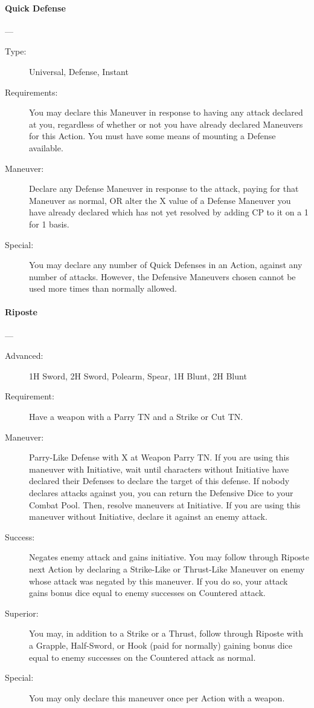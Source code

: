 \documentclass[oneside,11pt,english]{book}
\begin{document}
\paragraph{\large\label{man:Quick Defense}Quick Defense}---\quad{\large[2]}
\vspace{-10pt}\begin{description} 
\item [Type:] Universal, Defense, Instant 
\item [Requirements:] You may declare this Maneuver in response to having any attack declared at you, 
  regardless of whether or not you have already declared Maneuvers for this Action. You must have some 
  means of mounting a Defense available. 
\item [Maneuver:] Declare any Defense Maneuver in response to the attack, paying for that Maneuver as 
  normal, OR alter the X value of a Defense Maneuver you have already declared which has not yet 
  resolved by adding CP to it on a 1 for 1 basis. 
\item [Special:] You may declare any number of Quick Defenses in an Action, against any number of attacks. 
  However, the Defensive Maneuvers chosen cannot be used more times than normally allowed. 
\end{description}

\paragraph{\large\label{man:Riposte}Riposte}---\quad{\large[2+X]}
\vspace{-10pt}\begin{description}
\item [Advanced:] 1H Sword, 2H Sword, Polearm, Spear, 1H Blunt, 2H
  Blunt %
\item [Requirement:] Have a weapon with a Parry TN and a Strike or Cut TN. 
\item [Maneuver:] Parry-Like Defense with X at Weapon Parry TN. If you are using
  this maneuver with Initiative, wait until characters without Initiative have
  declared their Defenses to declare the target of this defense. If nobody
  declares attacks against you, you can return the Defensive Dice to your Combat
  Pool. Then, resolve maneuvers at Initiative. If you are using this maneuver
  without Initiative, declare it against an enemy attack.
\item [Success:] Negates enemy attack and gains initiative. You may follow
  through Riposte next Action by declaring a Strike-Like or Thrust-Like Maneuver
  on enemy whose attack was negated by this maneuver. If you do so, your attack
  gains bonus dice equal to enemy successes on Countered attack.
\item [Superior:] You may, in addition to a Strike or a Thrust, follow through
  Riposte with a Grapple, Half-Sword, or Hook (paid for normally) gaining bonus
  dice equal to enemy successes on the Countered attack as normal.
\item [Special:] You may only declare this maneuver once per Action with a weapon. 
\end{description}
\end{document}
